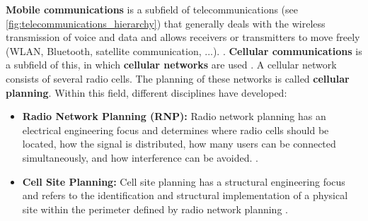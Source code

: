 \begin{English}
    \textbf{Mobile communications} is a subfield of telecommunications (see \ref{fig:telecommunications_hierarchy}) that generally deals with the wireless transmission of voice and data and allows receivers or transmitters to move freely (WLAN, Bluetooth, satellite communication, ...). \cite{bundesamtfurstrahlenschutzWhatMobileCommunication}. \textbf{Cellular communications} is a subfield of this, in which \textbf{cellular networks} are used \cite{jiangCellularCommunicationNetworks2024}. A cellular network consists of several radio cells. The planning of these networks is called \textbf{cellular planning}. Within this field, different disciplines have developed:

    \begin{itemize}
        \item \textbf{Radio Network Planning (RNP):} Radio network planning has an electrical engineering focus and determines where radio cells should be located, how the signal is distributed, how many users can be connected simultaneously, and how interference can be avoided. \cite{academyforlorawanrAcademyLoRaWANWhat,telecomtrainerRNPRadioNetwork2023}.

        \item \textbf{Cell Site Planning:} Cell site planning has a structural engineering focus and refers to the identification and structural implementation of a physical site within the perimeter defined by radio network planning \cite{habibPDFStudyCell2024}.
    \end{itemize}
\end{English}


